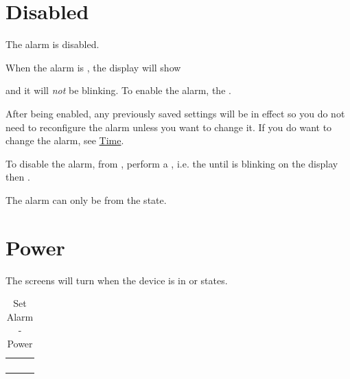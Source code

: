 \section{Disabled} 

The alarm is disabled.

\par\medskip

When the alarm is , the display will show


and it will \textit{not} be blinking.  To enable the alarm,  the .


After being enabled, any previously saved settings will be in effect so you
do not need to reconfigure the alarm unless you want to change it.  If you
do want to change the alarm, see \hyperref[Set Alarm - Time]{Time}.

\par\medskip

To disable the alarm, from , perform a , i.e.
 the  until \symD{<<<<} is blinking on the display then .


The alarm can only be  from the  state.

\section{Power}

The screens will turn  when the device is in  or 
states.

\begin{table}[H]
\begin{tabu}{ X[1,c,m] | X[1,c,m] | X[1,c,m] }
  \thrule
   &  &  \\ \mrule
   & 
    &  \\ 
   & & \\
  \bhrule
\end{tabu}
\caption {Set Alarm - Power}
\end{table}

